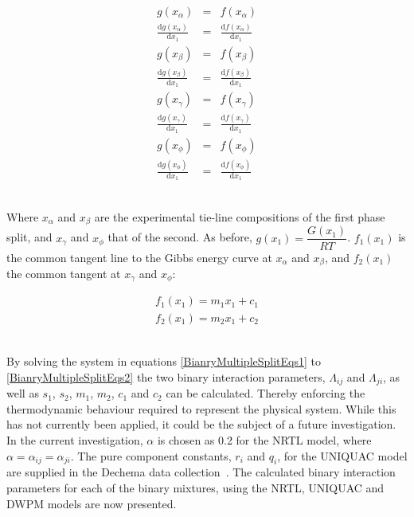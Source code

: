 \begin{eqnarray}
g\left(x_{\alpha}\right) &=& f\left(x_{\alpha}\right) \label{BianryMultipleSplitEqs1}\\
\frac{\mathrm{d}g\left(x_{\alpha}\right)}{\mathrm{d}x_{1}} &=& \frac{\mathrm{d}f\left(x_{\alpha}\right)}{\mathrm{d}x_{1}}\\
g\left(x_{\beta}\right) &=& f\left(x_{\beta}\right)\\
\frac{\mathrm{d}g\left(x_{\beta}\right)}{\mathrm{d}x_{1}} &=& \frac{\mathrm{d}f\left(x_{\beta}\right)}{\mathrm{d}x_{1}}\\
g\left(x_{\gamma}\right) &=& f\left(x_{\gamma}\right)\\
\frac{\mathrm{d}g\left(x_{\gamma}\right)}{\mathrm{d}x_{1}} &=& \frac{\mathrm{d}f\left(x_{\gamma}\right)}{\mathrm{d}x_{1}}\\
g\left(x_{\phi}\right) &=& f\left(x_{\phi}\right)\\
\frac{\mathrm{d}g\left(x_{\phi}\right)}{\mathrm{d}x_{1}} &=& \frac{\mathrm{d}f\left(x_{\phi}\right)}{\mathrm{d}x_{1}}\label{BianryMultipleSplitEqs2} 
\end{eqnarray}\

Where $x_{\alpha}$ and $x_{\beta}$ are the experimental tie-line compositions of the first phase split, and $x_{\gamma}$ and $x_{\phi}$ that of the second. As before, $g\left(x_{1}\right) = \dfrac{G\left(x_{1}\right)}{RT}$. $f_{1}\left(x_{1}\right)$ is the common tangent line to the Gibbs energy curve at $x_{\alpha}$ and $x_{\beta}$, and $f_{2}\left(x_{1}\right)$ the common tangent at $x_{\gamma}$ and $x_{\phi}$:\

\begin{eqnarray}
f_{1}\left(x_{1}\right) = m_{1}x_{1} + c_{1} \\
f_{2}\left(x_{1}\right) = m_{2}x_{1}+ c_{2} 
\end{eqnarray}\

By solving the system in equations \ref{BianryMultipleSplitEqs1} to \ref{BianryMultipleSplitEqs2} the two binary interaction parameters, $\Lambda_{ij}$ and $\Lambda_{ji}$, as well as $s_{1}$, $s_{2}$, $m_{1}$, $m_{2}$, $c_{1}$ and $c_{2}$ can be calculated. Thereby enforcing the thermodynamic behaviour required to represent the physical system. While this has not currently been applied, it could be the subject of a future investigation.\\

In the current investigation, $\alpha$ is chosen as 0.2 for the NRTL model, where $\alpha= \alpha_{ij}=\alpha_{ji}$. The pure component constants, $r_{i}$ and $q_{i}$, for the UNIQUAC model are supplied in the Dechema data collection~\cite{Dechema}. The calculated binary interaction parameters for each of the binary mixtures, using the NRTL, UNIQUAC and DWPM models are now presented.\\


